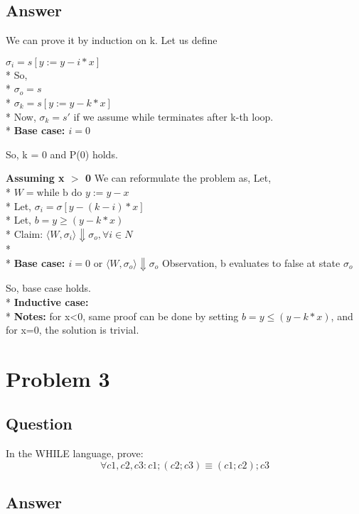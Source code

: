 \documentclass[a4paper, 11pt]{article}
\begin{document}
\subsection{Answer}

We can prove it by induction on k. Let us define

$\sigma_i = s[y := y -i*x]$
\\* So,
\\* $\sigma_o = s$
\\* $\sigma_k = s[y := y -k*x]$
\\* Now, $\sigma_k = s\prime$ if we assume while terminates after k-th loop.
\\* \textbf{Base case: $i = 0 $}

\begin{prooftree}

  
\end{prooftree} 

So, k = 0 and P(0) holds.

\textbf{Assuming x $>$ 0}
We can reformulate the problem as,
Let,
\\* $W = \textrm{while b do }y := y-x$ 
\\* Let, $\sigma_i = \sigma[y - (k-i)*x]$
\\* Let, $b = y \ge (y - k*x)$
\\* Claim: $ \langle W, \sigma_i \rangle \Downarrow \sigma_o, \forall i \in N $
\\* \\*
\textbf{Base case: $i = 0 \textrm{ or }  \langle W, \sigma_o \rangle \Downarrow \sigma_o $}
Observation, b evaluates to false at state $\sigma_o$
\begin{prooftree}

  
\end{prooftree} 
So, base case holds.
\\*
\textbf{Inductive case:}
\\*
\textbf{Notes:}
for x<0, same proof can be done by setting $b = y \le (y - k*x)$, and for x=0, the solution is trivial.
\section{Problem 3}

\subsection{Question}
In the WHILE language, prove:
$$\forall c1, c2, c3 : c1; (c2; c3) \equiv (c1; c2); c3$$

\subsection{Answer}
\end{document}
